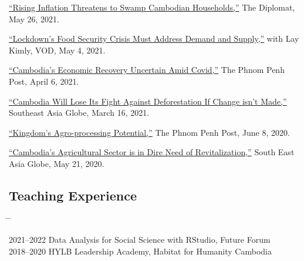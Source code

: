 \documentclass[10pt,a4paper]{article}
\newcommand{\tabbedblock}[1]{

	\begin{tabbing}
		\hspace{3cm} \= \hspace{4cm} \= \kill
		#1
	\end{tabbing}
}
\begin{document}
	\href{https://thediplomat.com/2021/05/rising-inflation-threatens-to-swamp-cambodian-households/}{``Rising Inflation Threatens to Swamp Cambodian Households,''} The Diplomat, May 26, 2021.\\ \vspace{-.5em}

	\href{https://vodenglish.news/opinion-lockdowns-food-security-crisis-must-address-demand-and-supply/}{``Lockdown's Food Security Crisis Must Address Demand and Supply,''} with Lay Kimly, VOD, May 4, 2021.\\ \vspace{-.5em}

	\href{https://www.phnompenhpost.com/opinion/cambodias-economic-recovery-uncertain-amid-covid}{``Cambodia's Economic Recovery Uncertain Amid Covid,''} The Phnom Penh Post, April 6, 2021.\\ \vspace{-.5em}

	\href{https://southeastasiaglobe.com/cambodia-deforestation-fight/}{``Cambodia Will Lose Its Fight Against Deforestation If Change isn't Made,''} Southeast Asia Globe, March 16, 2021.\\ \vspace{-.5em}

	\href{https://www.phnompenhpost.com/opinion/kingdoms-agro-processing-potential}{``Kingdom’s Agro-processing Potential,''} The Phnom Penh Post, June 8, 2020.\\  \vspace{-.5em}

	 \href{https://southeastasiaglobe.com/cambodias-agricultural-sector-is-one-in-dire-need-of-revitalising}{``Cambodia’s Agricultural Sector is in Dire Need of Revitalization,''} South East Asia Globe, May 21, 2020. 

\subsection*{Teaching Experience}

\tabbedblock{
	2021--2022 \> Data Analysis for Social Science with RStudio, Future Forum\\
	
	2018--2020 \> HYLB Leadership Academy, Habitat for Humanity Cambodia
}

\end{document}
